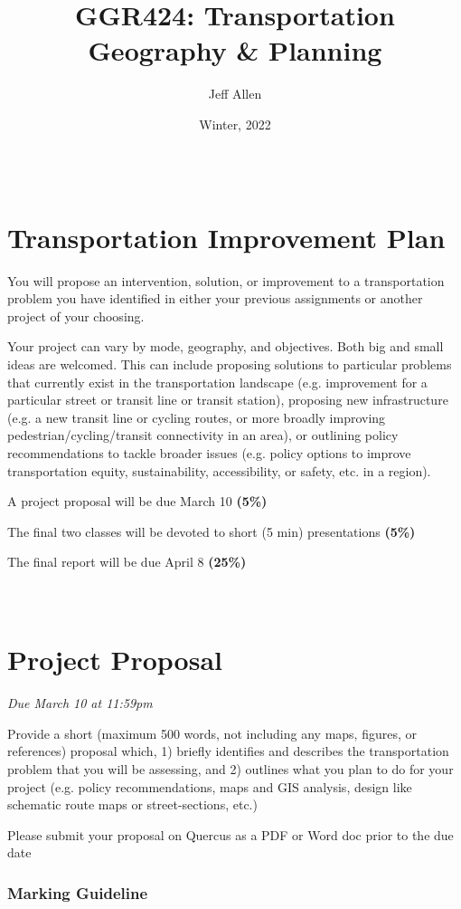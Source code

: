 \documentclass[11pt]{article}
\title{\textbf{GGR424: Transportation Geography \& Planning}}
\author{Jeff Allen}
\date{Winter, 2022}
\begin{document}
	
	\allsectionsfont{\sffamily}
	
	\section*{\\Transportation Improvement Plan}

	You will propose an intervention, solution, or improvement to a transportation problem you have identified in either your previous assignments or another project of your choosing. 
	
	Your project can vary by mode, geography, and objectives. Both big and small ideas are welcomed. This can include proposing solutions to particular problems that currently exist in the transportation landscape (e.g. improvement for a particular street or transit line or transit station), proposing new infrastructure (e.g. a new transit line or cycling routes, or more broadly improving pedestrian/cycling/transit connectivity in an area), or outlining policy recommendations to tackle broader issues (e.g. policy options to improve transportation equity, sustainability, accessibility, or safety, etc. in a region).
	
	A project proposal will be due March 10 \textbf{(5\%)}
	
	The final two classes will be devoted to short (5 min) presentations \textbf{(5\%)}
	
	The final report will be due April 8 \textbf{(25\%)}
	
	
	\newpage
	
	
	
	\section*{\\Project Proposal}
	
	\textit{Due March 10 at 11:59pm}
	
	Provide a short (maximum 500 words, not including any maps, figures, or references) proposal which, 1) briefly identifies and describes the transportation problem that you will be assessing, and 2) outlines what you plan to do for your project (e.g. policy recommendations, maps and GIS analysis, design like schematic route maps or street-sections, etc.)
	
	Please submit your proposal on Quercus as a PDF or Word doc prior to the due date

	\subsubsection*{Marking Guideline}
	
\end{document}
